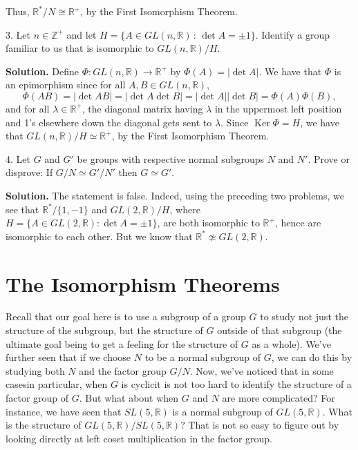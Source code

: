 \documentclass[10pt,]{book}
\theoremstyle{plain}
\theoremstyle{definition}
\theoremstyle{definition}
\theoremstyle{definition}
\theoremstyle{definition}
\numberwithin{equation}{section}
\def\Z{\mathbb{Z}}
\def\R{\mathbb{R}}
\DeclareMathOperator{\Ker}{Ker}
\begin{document}
\begin{exerciselist}
\begin{equation*}
\end{equation*}
%
\par
Thus, \(\R^*/N \cong \R^+\), by the First Isomorphism Theorem.%
\item[3.]\hypertarget{exercise-61}{}Let \(n\in \Z^+\) and let \(H=\{A\in GL(n,\R)\,:\, \det A =\pm
1\}\). Identify a group familiar to us that is isomorphic to \(GL(n,\R)/H\).%
\par\smallskip
\par\smallskip
\noindent\textbf{Solution.}\hypertarget{solution-61}{}\quad
Define \(\Phi:GL(n,\R)\to \R^+\) by \(\Phi(A)=|\det A|\). We have that \(\Phi\) is an epimorphism since for all \(A,B\in GL(n,\R)\),%
\begin{equation*}
\Phi(AB)=|\det AB|=|\det A \det B|=|\det
A||\det B|=\Phi(A)\Phi(B),
\end{equation*}
and for all \(\lambda \in \R^+\), the diagonal matrix having \(\lambda\) in the uppermost left position and 1's elsewhere down the diagonal gets sent to \(\lambda\). Since \(\Ker
\Phi=H\), we have that \(GL(n,\R)/H \simeq \R^+\), by the First Isomorphism Theorem.%
\item[4.]\hypertarget{exercise-62}{}Let \(G\) and \(G'\) be groups with respective normal subgroups \(N\) and \(N'\). Prove or disprove: If \(G/N\simeq G'/N'\) then \(G\simeq
G'\).%
\par\smallskip
\par\smallskip
\noindent\textbf{Solution.}\hypertarget{solution-62}{}\quad
The statement is false. Indeed, using the preceding two problems, we see that \(\R^*/\{1,-1\}\) and \(GL(2,\R)/H\), where \(H=\{A\in GL(2,\R):\det A =\pm 1\}\), are both isomorphic to \(\R^+\), hence are isomorphic to each other. But we know that \(\R^* \not\simeq GL(2,\R)\).%
\end{exerciselist}
\typeout{************************************************}
\typeout{************************************************}
\chapter[{The Isomorphism Theorems}]{The Isomorphism Theorems}\label{isothms}
Recall that our goal here is to use a subgroup of a group \(G\) to study not just the structure of the subgroup, but the structure of \(G\) outside of that subgroup (the ultimate goal being to get a feeling for the structure of \(G\) as a whole). We've further seen that if we choose \(N\) to be a normal subgroup of \(G\), we can do this by studying both \(N\) and the factor group \(G/N\). Now, we've noticed that in some cases\textemdash{}in particular, when \(G\) is cyclic\textendash{}it is not too hard to identify the structure of a factor group of \(G\). But what about when \(G\) and \(N\) are more complicated? For instance, we have seen that \(SL(5,\R)\) is a normal subgroup of \(GL(5,\R)\). What is the structure of \(GL(5,\R)/SL(5,\R)\)? That is not so easy to figure out by looking directly at left coset multiplication in the factor group.%
\typeout{************************************************}
\typeout{************************************************}
\end{document}
